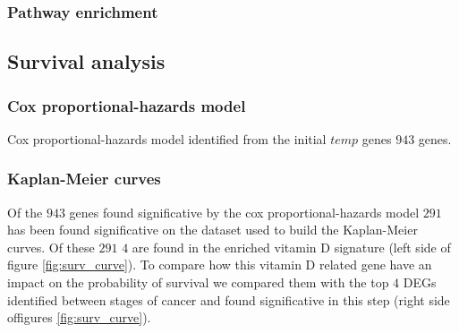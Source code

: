 \documentclass[fleqn,10pt]{SelfArx} %
\begin{document}
		\subsubsection{Pathway enrichment}

	\subsection{Survival analysis}

		\subsubsection{Cox proportional-hazards model}
		Cox proportional-hazards model identified from the initial $temp$ genes $943$ genes.

		\subsubsection{Kaplan-Meier curves}
		Of the $943$ genes found significative by the cox proportional-hazards model $291$ has been found significative on the dataset used to build the Kaplan-Meier curves.
		Of these $291$ $4$ are found in the enriched vitamin D signature (left side of figure \ref{fig:surv_curve}).
		To compare how this vitamin D related gene have an impact on the probability of survival we compared them with the top $4$ DEGs identified between stages of cancer and found significative in this step (right side offigures \ref{fig:surv_curve}).
\end{document}
